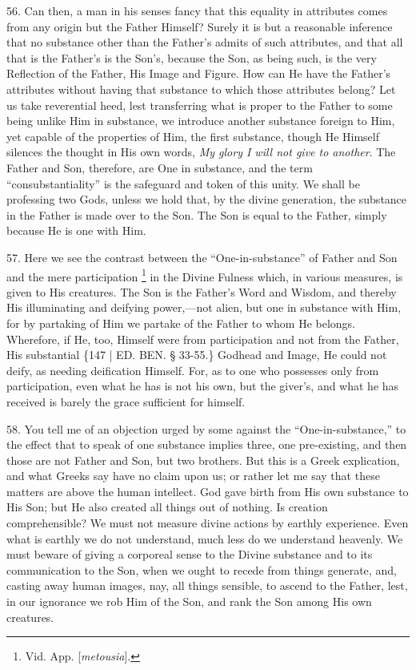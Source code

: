 56. Can then, a man in his
senses fancy that this equality in attributes comes from any origin
but the Father Himself? Surely it is but a reasonable inference that
no substance other than the Father's admits of such attributes, and
that all that is the Father's is the Son's, because the Son, as being
such, is the very Reflection of the Father, His Image and Figure. How
can He have the Father's attributes without having that substance to
which those attributes belong? Let us take reverential heed, lest
transferring what is proper to the Father to some being unlike Him in
substance, we introduce another substance foreign to Him, yet capable
of the properties of Him, the first substance, though He Himself
silences the thought in His own words, \emph{My glory I will not give to
another}. The Father and Son, therefore, are One in substance, and
the term ``consubstantiality'' is the safeguard and token of this unity.
We shall be professing two Gods, unless we hold that, by the divine
generation, the substance in the Father is made over to the Son. The
Son is equal to the Father, simply because He is one with Him.

57. Here we see the contrast
between the ``One-in-substance'' of Father and Son and the mere
participation \footnote{Vid. App. [\emph{metousia}].} in the
Divine Fulness which, in various measures, is given to His creatures.
The Son is the Father's Word and Wisdom, and thereby His illuminating
and deifying power,—not alien, but one in substance with Him, for by
partaking of Him we partake of the Father to whom He belongs.
Wherefore, if He, too, Himself were from participation and not from
the Father, His substantial \{147 | ED.
BEN. § 33-55.\} Godhead and Image, He could not
deify, as needing deification Himself. For, as to one who possesses
only from participation, even what he has is not his own, but the
giver's, and what he has received is barely the grace sufficient for
himself.

58. You tell me of an
objection urged by some against the ``One-in-substance,'' to the effect
that to speak of one substance implies three, one pre-existing, and
then those are not Father and Son, but two brothers. But this is a
Greek explication, and what Greeks say have no claim upon us; or
rather let me say that these matters are above the human intellect.
God gave birth from His own substance to His Son; but He also created
all things out of nothing. Is creation comprehensible? We must not
measure divine actions by earthly experience. Even what is earthly we
do not understand, much less do we understand heavenly. We must beware
of giving a corporeal sense to the Divine substance and to its
communication to the Son, when we ought to recede from things
generate, and, casting away human images, nay, all things sensible, to
ascend to the Father, lest, in our ignorance we rob Him of the Son,
and rank the Son among His own creatures.

